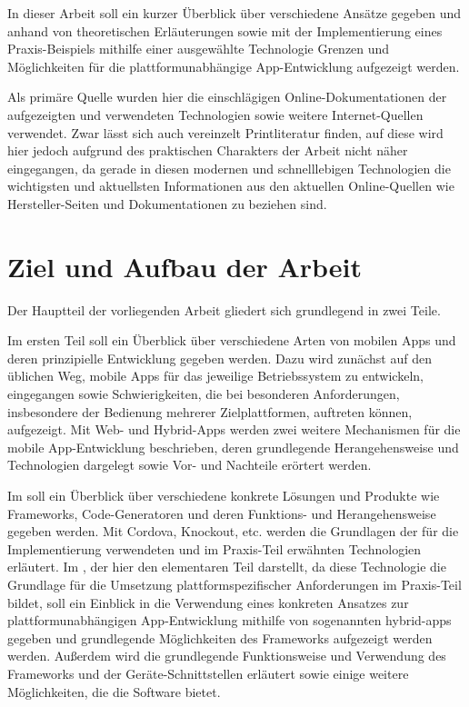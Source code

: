 In dieser Arbeit soll ein kurzer Überblick über verschiedene Ansätze gegeben und anhand von theoretischen Erläuterungen sowie mit der Implementierung eines Praxis-Beispiels mithilfe einer ausgewählte Technologie Grenzen und Möglichkeiten für die plattformunabhängige App-Entwicklung aufgezeigt werden.

	Als primäre Quelle wurden hier die einschlägigen Online-Dokumentationen der aufgezeigten und verwendeten Technologien sowie weitere Internet-Quellen verwendet. 
	Zwar lässt sich auch vereinzelt Printliteratur finden, auf diese wird hier jedoch aufgrund des praktischen Charakters der Arbeit nicht näher eingegangen, da gerade in diesen modernen und schnelllebigen Technologien die wichtigsten und aktuellsten Informationen aus den aktuellen Online-Quellen wie Hersteller-Seiten und Dokumentationen zu beziehen sind.
	
	\pagebreak
\section{Ziel und Aufbau der Arbeit}

Der Hauptteil der vorliegenden Arbeit gliedert sich grundlegend in zwei Teile.

Im ersten Teil  soll ein Überblick über verschiedene Arten von mobilen Apps und deren prinzipielle Entwicklung gegeben werden. 
		Dazu wird zunächst auf den üblichen Weg, mobile Apps für das jeweilige Betriebssystem zu entwickeln, eingegangen sowie Schwierigkeiten, die bei besonderen Anforderungen, insbesondere der Bedienung mehrerer Zielplattformen, auftreten können, aufgezeigt.
		Mit Web- und Hybrid-Apps werden zwei weitere Mechanismen für die mobile App-Entwicklung beschrieben, deren grundlegende Herangehensweise und Technologien dargelegt sowie Vor- und Nachteile erörtert werden.

	Im  soll ein Überblick über verschiedene konkrete Lösungen und Produkte wie Frameworks, Code-Generatoren und deren Funktions- und Herangehensweise gegeben werden.
	Mit Cordova, Knockout, etc. werden die Grundlagen der für die Implementierung verwendeten und im Praxis-Teil erwähnten Technologien erläutert. 
	Im , der hier den elementaren Teil darstellt, da diese Technologie die Grundlage für die Umsetzung plattformspezifischer Anforderungen im Praxis-Teil bildet, soll ein Einblick in die Verwendung eines konkreten Ansatzes zur plattformunabhängigen App-Entwicklung mithilfe von sogenannten \glspl{hybrid-app} gegeben und grundlegende Möglichkeiten des Frameworks aufgezeigt werden werden.
	Außerdem wird die grundlegende Funktionsweise und Verwendung des Frameworks und der Geräte-Schnittstellen erläutert sowie einige weitere Möglichkeiten, die die Software bietet.

